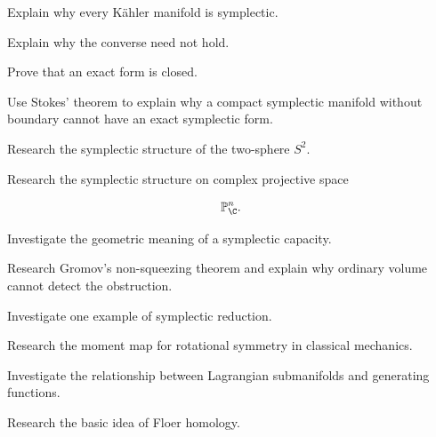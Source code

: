 \begin{exercise}[3]
Explain why every K\"ahler manifold is symplectic.
\end{exercise}

\begin{exercise}[3]
Explain why the converse need not hold.
\end{exercise}

\begin{exercise}[3]
Prove that an exact form is closed.
\end{exercise}

\begin{exercise}[3]
Use Stokes' theorem to explain why a compact symplectic manifold without
boundary cannot have an exact symplectic form.
\end{exercise}

\begin{exercise}[4]
Research the symplectic structure of the two-sphere \(S^2\).
\end{exercise}

\begin{exercise}[4]
Research the symplectic structure on complex projective space

\[
\mathbb{P}^n_{\C}.
\]
\end{exercise}

\begin{exercise}[4]
Investigate the geometric meaning of a symplectic capacity.
\end{exercise}

\begin{exercise}[4]
Research Gromov's non-squeezing theorem and explain why ordinary volume
cannot detect the obstruction.
\end{exercise}

\begin{exercise}[4]
Investigate one example of symplectic reduction.
\end{exercise}

\begin{exercise}[4]
Research the moment map for rotational symmetry in classical mechanics.
\end{exercise}

\begin{exercise}[4]
Investigate the relationship between Lagrangian submanifolds and generating
functions.
\end{exercise}

\begin{exercise}[4]
Research the basic idea of Floer homology.
\end{exercise}

